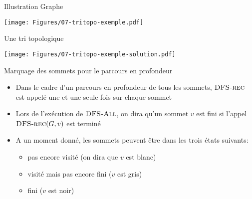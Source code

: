 \begin{frame}{Illustration}
Graphe

\centerline{\texttt{[image: Figures/07-tritopo-exemple.pdf]}}

\bigskip

Une tri topologique

\centerline{\texttt{[image: Figures/07-tritopo-exemple-solution.pdf]}}

\end{frame}

\begin{frame}{Marquage des sommets pour le parcours en profondeur}

\begin{itemize}
\item Dans le cadre d'un parcours en profondeur de tous les sommets,
  $\textnormal{\scshape DFS-rec}$ est appelé une et une seule fois sur chaque sommet
\item Lors de l'exécution de $\textnormal{\scshape DFS-All}$, on dira qu'un sommet
  $v$ est \alert{fini} si l'appel $\textnormal{\scshape DFS-rec}(G,v)$ est terminé
\item A un moment donné, les sommets peuvent être dans les trois états suivants:
\begin{itemize}
\item pas encore visité (on dira que $v$ est \alert{blanc})
\item visité mais pas encore fini ($v$ est \alert{gris})
\item fini ($v$ est \alert{noir})
\end{itemize}
\end{itemize}
\end{frame}

